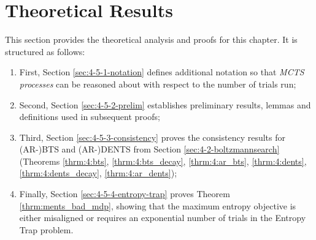         
            
            
            
            
            



































\section{Theoretical Results}
\label{sec:4-5-theory}

    This section provides the theoretical analysis and proofs for this chapter. It is structured as follows:
    \begin{enumerate}
        \item 
            First, Section \ref{sec:4-5-1-notation} defines additional notation so that \textit{MCTS processes} can be reasoned about with respect to the number of trials run;
        \item 
            Second, Section \ref{sec:4-5-2-prelim} establishes preliminary results, lemmas and definitions used in subsequent proofs;
        \item 
            Third, Section \ref{sec:4-5-3-consistency} proves the consistency results for (AR-)BTS and \mbox{(AR-)DENTS} from Section \ref{sec:4-2-boltzmannsearch} (Theorems \ref{thrm:4:bts}, \ref{thrm:4:bts_decay}, \ref{thrm:4:ar_bts}, \ref{thrm:4:dents}, \ref{thrm:4:dents_decay}, \ref{thrm:4:ar_dents}); 
        \item 
            Finally, Section \ref{sec:4-5-4-entropy-trap} proves Theorem \ref{thrm:ments_bad_mdp}, showing that the maximum entropy objective is either misaligned or requires an exponential number of trials in the Entropy Trap problem.
    \end{enumerate}

